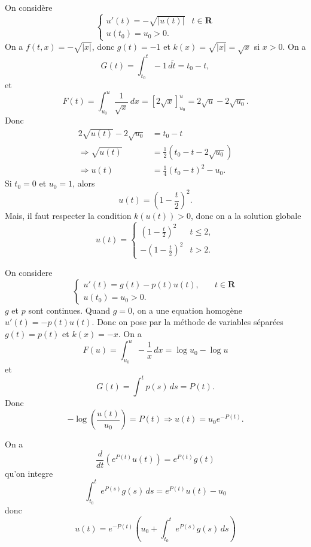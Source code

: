 \begin{example}
On considère
$$
\begin{cases}
u'(t)=-\sqrt{ |u(t)| } & t\in \mathbf{R} \\
u(t_{0})=u_{0}>0.
\end{cases}
$$
On a $f(t,x)=-\sqrt{ |x| }$, donc $g(t)=-1$ et $k(x)=\sqrt{ |x| }=\sqrt{ x }$ si $x>0$. On a
$$
G(t)=\int_{t_{0}}^{t} -1 \, d\tilde{t}=t_{0}-t, 
$$
et
$$
F(t)=\int_{u_{0}}^{u} \frac{1}{\sqrt{ x }} \, dx=[2\sqrt{ x }]^{u}_{u_{0}}=2\sqrt{ u }-2\sqrt{ u_{0}}. 
$$
Donc
\begin{align*}
2\sqrt{ u(t) } -2\sqrt{ u_{0} } & =t_{0}-t  \\
\Rightarrow \sqrt{ u(t) } & =\frac{1}{2}(t_{0}-t-2\sqrt{ u_{0} }) \\
\Rightarrow u(t) & =\frac{1}{4}(t_{0}-t)^{2}-u_{0}.
\end{align*}
Si $t_{0}=0$ et $u_{0}=1$, alors
$$
u(t)=\left( 1-\frac{t}{2} \right)^{2}.
$$Mais, il faut respecter la condition $k(u(t))>0$, donc on a la solution globale
$$
u(t)=\begin{cases}
\left( 1-\frac{t}{2} \right)^{2} & t\le 2 ,\\
-\left( 1-\frac{t}{2} \right)^{2} & t>2.
\end{cases}
$$
\end{example}
\begin{example}
On considere
$$
\begin{cases}
u'(t)=g(t)-p(t)u(t), \quad  & t \in \mathbf{R} \\
u(t_{0})=u_{0}>0.
\end{cases}
$$
$g$ et $p$ sont continues. Quand $g=0$, on a une equation homogène $u'(t)=-p(t)u(t)$. Donc on pose par la méthode de variables séparées $g(t)=p(t)$ et $k(x)=-x$.  On a
$$
F(u)=\int_{u_{0}}^{u} -\frac{1}{x}  \, dx=\log u_{0}-\log u
$$
et
$$
	G(t)=\int^{t}p(s)  \, ds=P(t). 
$$
Donc
$$
-\log\left( \frac{u(t)}{u_{0}} \right)=P(t)\Rightarrow u(t)=u_{0}e^{-P(t)}.
$$

On a
$$
\frac{d}{dt} (e^{ P(t) }u(t))=e^{ P(t) }g(t)
$$
qu'on integre
$$
\int_{t_{0}}^{t} e^{ P(s) }g(s) \, ds=e^{ P(t) }u(t)-u_{0} 
$$
donc
$$
u(t)=e^{ -P(t) }\left( u_{0}+\int_{t_{0}}^{t} e^{ P(s) }g(s) \, ds  \right)
$$
\end{example}
